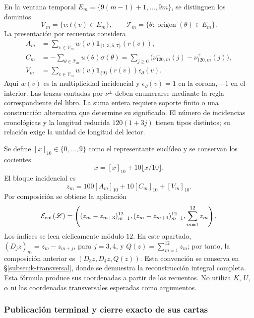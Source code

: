 En la ventana temporal
\(E_m=\{9(m-1)+1,\ldots,9m\}\), se distinguen los dominios
\[
 \mathscr V_m=\{v:t(v)\in E_m\},\qquad
 \mathscr T_m=\{\theta:\operatorname{origen}(\theta)\in E_m\}.
\]
La presentación por recuentos considera
\begin{align}
 A_m&=\sum_{v\in\mathscr V_m}w(v)
             \mathbf1_{\{1,3,5,7\}}(r(v)),\\
 C_m&=-\sum_{\theta\in\mathscr T_m}u(\theta)\sigma(\theta)
      =\sum_{j\geq0}\bigl(\nu^-_{120,m}(j)-\nu^+_{120,m}(j)\bigr),\\
 V_m&=\sum_{v\in\mathscr V_m}w(v)
              \mathbf1_{\{9\}}(r(v))\epsilon_\partial(v).
\end{align}
Aquí \(w(v)\) es la multiplicidad incidencial y
\(\epsilon_\partial(v)=1\) en la corona, \(-1\) en el interior.
Las trazas contadas por \(\nu^\pm\) deben enumerarse mediante la regla
correspondiente del libro. La suma entera requiere soporte finito o una
construcción alternativa que determine su significado. El número de
incidencias cronológicas y la longitud reducida \(120(1+3j)\) tienen
tipos distintos; su relación exige la unidad de longitud del lector.

Se define \([x]_{10}\in\{0,\ldots,9\}\) como el representante
euclídeo y se conservan los cocientes
\[
 x=[x]_{10}+10\lfloor x/10\rfloor.
\]
El bloque incidencial es
\begin{equation}
 z_m=100[A_m]_{10}+10[C_m]_{10}+[V_m]_{10}.
 \label{eq:registro-bloque-incidencial}
\end{equation}
Por composición se obtiene la aplicación
\begin{equation}
 \mathcal E_{\rm cnt}(\mathscr L)=
 \left((z_m-z_{m+3})_{m=1}^{12},
       (z_m-z_{m+4})_{m=1}^{12},\sum_{m=1}^{12}z_m\right).
\label{eq:registro-composicion-incidencial}
\end{equation}
Los índices se leen cíclicamente módulo \(12\). En este apartado,
\((D_jz)_m=z_m-z_{m+j}\), para \(j=3,4\), y
\(Q(z)=\sum_{m=1}^{12}z_m\); por tanto, la composición anterior es
\((D_3z,D_4z,Q(z))\). Esta convención se conserva en
\S\ref{subsec:k-transversal}, donde se demuestra la reconstrucción
integral completa.
Esta fórmula produce sus coordenadas a partir de los recuentos. No utiliza
\(K\), \(U\), \(\alpha\) ni las coordenadas transversales esperadas
como argumentos.

\subsubsection{Publicación terminal y cierre exacto de sus cartas}

